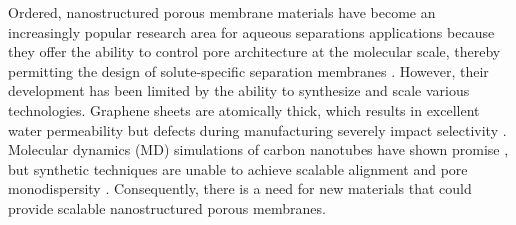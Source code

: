 \documentclass[journal=jpcbfk,manuscript=article]{achemso}
\begin{document}

  Ordered, nanostructured porous membrane materials have become an increasingly popular
  research area for aqueous separations applications because they offer the 
  ability to control pore architecture at the molecular scale, thereby 
  permitting the design of solute-specific separation membranes 
  \cite{humplik_nanostructured_2011}. However, their development has been 
  limited by the ability to synthesize and scale various technologies. Graphene
  sheets are atomically thick, which results in excellent water permeability but
  defects during manufacturing severely impact selectivity \cite{cohen-tanugi_multilayer_2016}.
  Molecular dynamics (MD) simulations of carbon nanotubes have shown promise
  \cite{humplik_nanostructured_2011}, but synthetic techniques are unable to
  achieve scalable alignment and pore monodispersity
  \cite{hata_water-assisted_2004,maruyama_growth_2005}. Consequently, there is a
  need for new materials that could provide scalable nanostructured porous membranes. 


  
\end{document}
